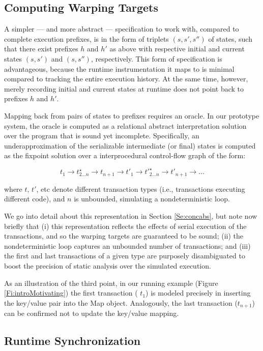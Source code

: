 \subsection{Computing Warping Targets}

A simpler --- and more abstract --- specification to work with, compared to complete execution prefixes, is in the form of triplets $(s,s',s'')$ of states, such that there exist prefixes $h$ and $h'$ as above with respective initial and current states $(s,s')$ and $(s,s'')$, respectively. This form of specification is advantageous, because the runtime instrumentation it maps to is minimal compared to tracking the entire execution history. At the same time, however, merely recording initial and current states at runtime does not point back to prefixes $h$ and $h'$.

Mapping back from pairs of states to prefixes requires an oracle. In our prototype system, the oracle is computed as a relational abstract interpretation solution over the program that is sound yet incomplete. Specifically, an underapproximation of the serializable intermediate (or final) states is computed as the fixpoint solution over a interprocedural control-flow graph of the form: 
\begin{center}
$$
	t_1 \rightarrow t^\star_{2 \ldots n} \rightarrow t_{n+1} \rightarrow t'_1 \rightarrow t'^\star_{2 \ldots n} \rightarrow t'_{n+1} \rightarrow \ldots
$$
\end{center}
where $t$, $t'$, etc denote different transaction types (i.e., transactions executing different code), and $n$ is unbounded, simulating a nondeterministic loop. 

We go into detail about this representation in Section \ref{Se:concabs}, but note now briefly that (i) this representation reflects the effects of serial execution of the transactions, and so the warping targets are guaranteed to be sound; (ii) the nondeterministic loop captures an unbounded number of transactions; and (iii) the first and last transactions of a given type are purposely disambiguated to boost the precision of static analysis over the simulated execution.

As an illustration of the third point, in our running example (Figure \ref{Fi:introMotivating}) the first transaction ( $t_1$) is modeled precisely in inserting the key/value pair into the {\sf Map} object. Analogously, the last transaction ($t_{n+1}$) can be confirmed not to update the key/value mapping.

\subsection{Runtime Synchronization} 

